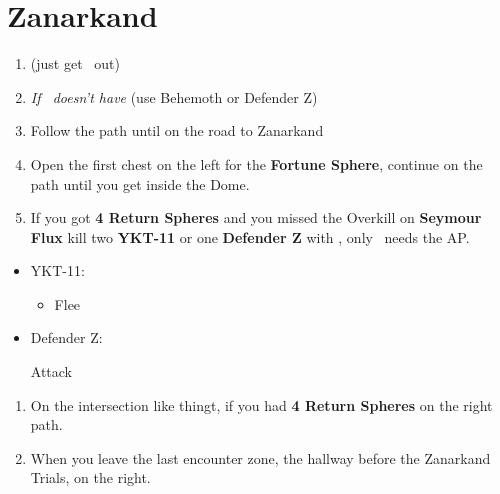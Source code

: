\chapter{Zanarkand}
\begin{enumerate}
    \item \formation{\tidus}{\auron}{\kimahri} (just get \yuna\ out)
    \item \textit{If \rikku\ doesn't have \od} \formation{\tidus}{\auron}{\rikku} (use Behemoth or Defender Z)
    \item Follow the path until on the road to Zanarkand
    \item Open the first chest on the left for the \textbf{Fortune Sphere}, continue on the path until you get inside the Dome.
    \item If you got \textbf{4 Return Spheres} and you missed the Overkill on \textbf{Seymour Flux} kill two \textbf{YKT-11} or one \textbf{Defender Z} with \formation{\tidus}{\auron}{\yuna}, only \yuna\ needs the AP.
\end{enumerate}
\begin{encounters}
    \begin{itemize}
        \item YKT-11:
        \begin{itemize}
            \yunaf Attack
            \tidusf Attack
            \item Flee
        \end{itemize}
        \item Defender Z:
        \begin{itemize}
            \summon{\bahamut}
            \bahamutf Attack
        \end{itemize}
    \end{itemize}
\end{encounters}
\begin{enumerate}[resume]
    \item On the intersection like thingt, if you had \textbf{4 Return Spheres}  on the right path.
    \item When you leave the last encounter zone, the hallway before the Zanarkand Trials,  on the right.
\end{enumerate}
